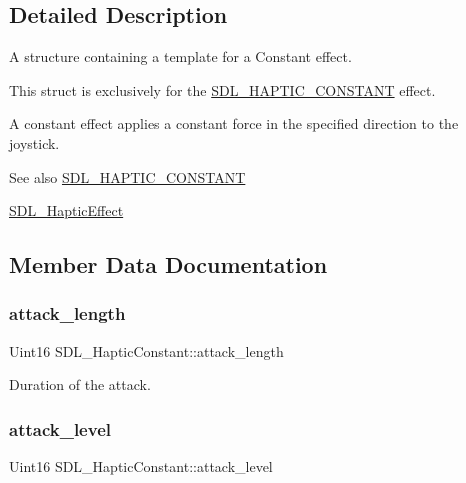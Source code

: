 \subsection{Detailed Description}
A structure containing a template for a Constant effect. 

This struct is exclusively for the \mbox{\hyperlink{_s_d_l__haptic_8h_a955fb9f680dcf9cc72a3d5263e85b80a}{S\+D\+L\+\_\+\+H\+A\+P\+T\+I\+C\+\_\+\+C\+O\+N\+S\+T\+A\+NT}} effect.

A constant effect applies a constant force in the specified direction to the joystick.

\begin{DoxySeeAlso}{See also}
\mbox{\hyperlink{_s_d_l__haptic_8h_a955fb9f680dcf9cc72a3d5263e85b80a}{S\+D\+L\+\_\+\+H\+A\+P\+T\+I\+C\+\_\+\+C\+O\+N\+S\+T\+A\+NT}} 

\mbox{\hyperlink{union_s_d_l___haptic_effect}{S\+D\+L\+\_\+\+Haptic\+Effect}} 
\end{DoxySeeAlso}


\subsection{Member Data Documentation}
\mbox{\label{struct_s_d_l___haptic_constant_a907bade68ab53fb24e7d2651d19b767f}} 
\subsubsection{\texorpdfstring{attack\_length}{attack\_length}}
{\footnotesize\ttfamily Uint16 S\+D\+L\+\_\+\+Haptic\+Constant\+::attack\+\_\+length}

Duration of the attack. \mbox{\label{struct_s_d_l___haptic_constant_a0928a37f3fab0e5b7daffc7a1d65744c}} 
\subsubsection{\texorpdfstring{attack\_level}{attack\_level}}
{\footnotesize\ttfamily Uint16 S\+D\+L\+\_\+\+Haptic\+Constant\+::attack\+\_\+level}

